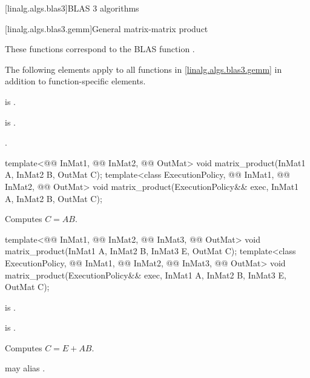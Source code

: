 [linalg.algs.blas3]{BLAS 3 algorithms}

[linalg.algs.blas3.gemm]{General matrix-matrix product}

\pnum
\begin{note}
These functions correspond to the BLAS function .
\end{note}

\pnum
The following elements apply
to all functions in \ref{linalg.algs.blas3.gemm}
in addition to function-specific elements.

\pnum
\mandates
{}
is .

\pnum
\expects
{} is .

\pnum
\complexity
{}.

\begin{itemdecl}
  template<@@ InMat1, @@ InMat2, @@ OutMat>
    void matrix_product(InMat1 A, InMat2 B, OutMat C);
  template<class ExecutionPolicy, @@ InMat1, @@ InMat2, @@ OutMat>
    void matrix_product(ExecutionPolicy&& exec, InMat1 A, InMat2 B, OutMat C);
\end{itemdecl}

\begin{itemdescr}
\pnum
\effects
Computes $C = A B$.
\end{itemdescr}

\begin{itemdecl}
template<@@ InMat1, @@ InMat2, @@ InMat3, @@ OutMat>
  void matrix_product(InMat1 A, InMat2 B, InMat3 E, OutMat C);
template<class ExecutionPolicy,
         @@ InMat1, @@ InMat2, @@ InMat3, @@ OutMat>
  void matrix_product(ExecutionPolicy&& exec, InMat1 A, InMat2 B, InMat3 E, OutMat C);
\end{itemdecl}

\begin{itemdescr}
\pnum
\mandates
{} is .

\pnum
\expects
{} is .

\pnum
\effects
Computes $C = E + A B$.

\pnum
\remarks
{} may alias .
\end{itemdescr}

